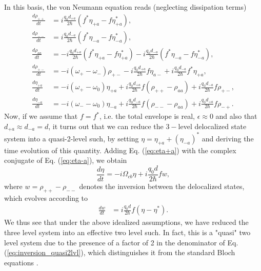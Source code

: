 \documentclass[]{spie}  %
\begin{document}
In this basis, the von Neumann equation reads (neglecting dissipation terms)
\begin{subequations}
\begin{align}
\frac{d \rho_{++}}{dt} &= i\frac{q_0d_{+a}}{2\hbar}(f^*\eta_{+a}-f\eta_{+a}^*), \\
\frac{d \rho_{--}}{dt} &= i\frac{q_0d_{-a}}{2\hbar}(f^*\eta_{-a}-f\eta_{-a}^*), \\
\frac{d \rho_{aa}}{dt} &= -i\frac{q_0d_{+a}}{2\hbar}(f^*\eta_{+a}-f\eta_{+a}^*)-i\frac{q_0d_{-a}}{2\hbar}(f^*\eta_{-a}-f\eta_{-a}^*), \\
\frac{d \rho_{+-}}{dt} &= -i(\omega_+-\omega_-)\rho_{+-}-i\frac{q_0d_{+a}}{2\hbar}f\eta_{a-}+i\frac{q_0d_{-a}}{2\hbar}f^*\eta_{+a},\\
\frac{d \eta_{+a}}{dt} &= -i(\omega_+-\omega_0)\eta_{+a}+i\frac{q_0d_{+a}}{2\hbar}f(\rho_{++}-\rho_{aa})+i\frac{q_0d_{-a}}{2\hbar}f\rho_{+-}, \label{eq:eta+a}\\
\frac{d \eta_{-a}}{dt} &= -i(\omega_--\omega_0)\eta_{-a}+i\frac{q_0d_{-a}}{2\hbar}f(\rho_{--}-\rho_{aa})+i\frac{q_0d_{+a}}{2\hbar}f\rho_{-+}. \label{eq:eta-a}
\end{align}
\end{subequations}
Now, if we assume that $f = f^*$, i.e. the total envelope is real,  $\epsilon \approx 0$ and also that $d_{+a}\approx d_{-a} = d$, it turns out that we can reduce the $3-$level delocalized state system into a quasi-2-level such, by setting  $\eta = \eta_{+a}+(\eta_{-a})^*$ and deriving the time evolution of this quantity. Adding Eq. (\ref{eq:eta+a}) with the complex conjugate of Eq. (\ref{eq:eta-a}), we obtain
\begin{equation}
\label{eq:coherence_quasi2lvl}
\frac{d \eta}{dt} = -i\Omega_{cb} \eta + i\frac{q_0d}{2\hbar}fw, 
\end{equation}
where $w = \rho_{++}-\rho_{--}$ denotes the inversion between the delocalized states, which	 evolves according to 
\begin{align}
\label{eq:inversion_quasi2lvl}
\frac{d w }{dt}	&=  i\frac{q_0d}{2\hbar}f(\eta-\eta^*).
\end{align}
We thus see that under the above idealized assumptions, we have reduced the three level system into an effective two level such. In fact, this is a "quasi" two level system due to the presence of a factor of 2 in the denominator of Eq. (\ref{eq:inversion_quasi2lvl}), which distinguishes it from the standard Bloch equations \cite{boyd2003nonlinear}.
\end{document}
